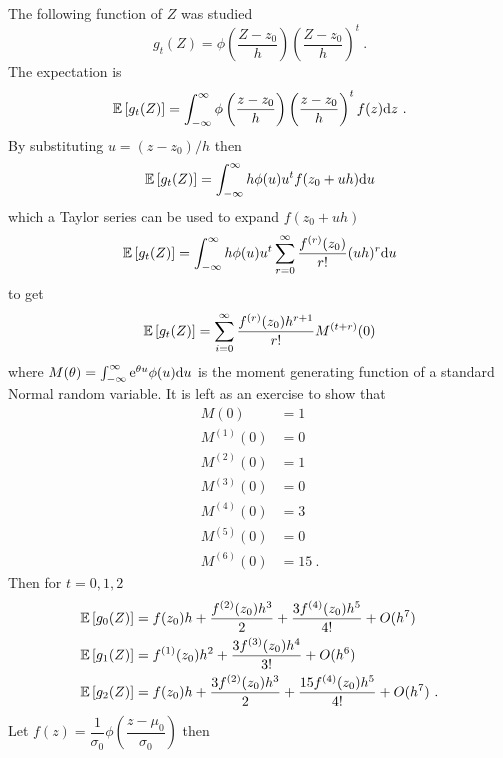 The following function of $Z$ was studied
\begin{equation}
g_t(Z) = \phi\left(
  \dfrac{Z - z_0}{h}
\right)
\left(
  \dfrac{Z - z_0}{h}
\right)^t
\ .
\end{equation}
The expectation is
\begin{equation}
\operatorname{\mathbb{E}}\left[g_t(Z)\right] = 
\int_{-\infty}^{\infty}
\phi\left(
  \dfrac{z - z_0}{h}
\right)
\left(
  \dfrac{z - z_0}{h}
\right)^t
f(z) \mathrm{d} z \ .
\end{equation}
By substituting $u=(z-z_0)/h$ then
\begin{equation}
\operatorname{\mathbb{E}}\left[g_t(Z)\right] = 
\int_{-\infty}^{\infty}
h\phi(u)u^tf(z_0+uh)\mathrm{d} u
\end{equation}
which a Taylor series can be used to expand $f(z_0+uh)$
\begin{equation}
\operatorname{\mathbb{E}}\left[g_t(Z)\right] = 
\int_{-\infty}^{\infty}
h\phi(u)u^t
\sum_{r=0}^\infty \dfrac{
  f^{(r)}(z_0)
  }
  {
  r!
  }
(uh)^r
\mathrm{d} u
\end{equation}
to get
\begin{equation}
\operatorname{\mathbb{E}}\left[g_t(Z)\right] = 
\sum_{i=0}^\infty
\dfrac{
  f^{(r)}(z_0)h^{r+1}
}
{
  r!
}
M^{(t+r)}(0)
\end{equation}
where $M(\theta)=\int_{-\infty}^{\infty}\mathrm{e}^{\theta u}\phi(u)\mathrm{d} u$ is the moment generating function of a standard Normal random variable. It is left as an exercise to show that
\begin{align}
M(0) &= 1
\\
M^{(1)}(0) & = 0
\\
M^{(2)}(0) & = 1
\\
M^{(3)}(0) & = 0
\\
M^{(4)}(0) & = 3
\\
M^{(5)}(0) & = 0
\\
M^{(6)}(0) & = 15 \ .
\end{align}
Then for $t=0,1,2$
\begin{align}
\operatorname{\mathbb{E}}\left[g_0(Z)\right]
&=
f(z_0)h
+\dfrac{f^{(2)}(z_0)h^3}{2}
+\dfrac{3f^{(4)}(z_0)h^5}{4!}
+O(h^7)
\label{eq:appendix_expectation1}\\
\operatorname{\mathbb{E}}\left[g_1(Z)\right]
&=
f^{(1)}(z_0)h^2
+\dfrac{3f^{(3)}(z_0)h^4}{3!}
+O(h^6)
\label{eq:appendix_expectation2}\\
\operatorname{\mathbb{E}}\left[g_2(Z)\right]
&=
f(z_0)h
+\dfrac{3f^{(2)}(z_0)h^3}{2}
+\dfrac{15f^{(4)}(z_0)h^5}{4!}
+O(h^7)
\label{eq:appendix_expectation3}\ .
\end{align}
Let $f(z)=\dfrac{1}{\sigma_0}\phi\left(\dfrac{z-\mu_0}{\sigma_0}\right)$ then
